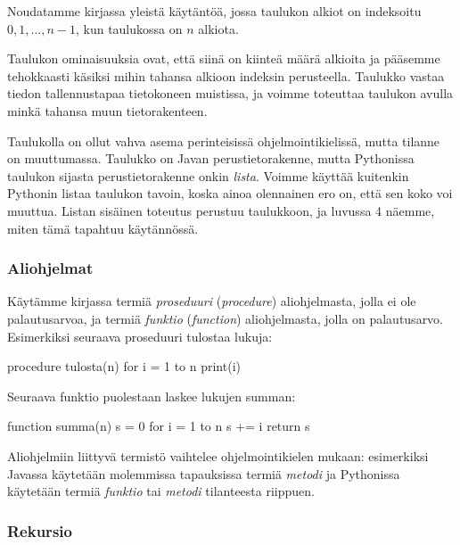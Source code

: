 Noudatamme kirjassa yleistä käytäntöä, jossa taulukon alkiot on indeksoitu
$0,1,\dots,n-1$, kun taulukossa on $n$ alkiota.

Taulukon ominaisuuksia ovat, että siinä on kiinteä määrä alkioita ja
pääsemme tehokkaasti käsiksi mihin tahansa alkioon indeksin perusteella.
Taulukko vastaa tiedon tallennustapaa tietokoneen muistissa,
ja voimme toteuttaa taulukon avulla minkä tahansa muun tietorakenteen.


Taulukolla on ollut vahva asema perinteisissä ohjelmointikielissä,
mutta tilanne on muuttumassa.
Taulukko on Javan perustietorakenne, mutta Pythonissa
taulukon sijasta perustietorakenne onkin \emph{lista}.
Voimme käyttää kuitenkin Pythonin listaa taulukon tavoin,
koska ainoa olennainen ero on, että sen koko voi muuttua.
Listan sisäinen toteutus perustuu taulukkoon,
ja luvussa 4 näemme, miten tämä tapahtuu käytännössä.

\subsubsection{Aliohjelmat}


Käytämme kirjassa termiä \emph{proseduuri} (\emph{procedure})
aliohjelmasta, jolla ei ole palautusarvoa,
ja termiä \emph{funktio} (\emph{function}) aliohjelmasta, jolla on palautusarvo.
Esimerkiksi seuraava proseduuri tulostaa lukuja:

\begin{code}
procedure tulosta(n)
    for i = 1 to n
        print(i)
\end{code}

Seuraava funktio puolestaan laskee lukujen summan:

\begin{code}
function summa(n)
    s = 0
    for i = 1 to n
        s += i
    return s
\end{code}

Aliohjelmiin liittyvä termistö vaihtelee ohjelmointikielen mukaan:
esimerkiksi Javassa käytetään molemmissa tapauksissa termiä
\emph{metodi} ja Pythonissa käytetään termiä \emph{funktio} tai
\emph{metodi} tilanteesta riippuen.

\subsubsection{Rekursio}

